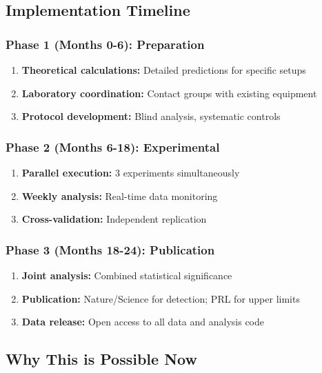 \documentclass[11pt,a4paper]{article}
\begin{document}
	\subsection{Implementation Timeline}
	
	\subsubsection{Phase 1 (Months 0-6): Preparation}
	
	\begin{enumerate}
		\item \textbf{Theoretical calculations:} Detailed predictions for specific setups
		\item \textbf{Laboratory coordination:} Contact groups with existing equipment
		\item \textbf{Protocol development:} Blind analysis, systematic controls
	\end{enumerate}
	
	\subsubsection{Phase 2 (Months 6-18): Experimental}
	
	\begin{enumerate}
		\item \textbf{Parallel execution:} 3 experiments simultaneously
		\item \textbf{Weekly analysis:} Real-time data monitoring
		\item \textbf{Cross-validation:} Independent replication
	\end{enumerate}
	
	\subsubsection{Phase 3 (Months 18-24): Publication}
	
	\begin{enumerate}
		\item \textbf{Joint analysis:} Combined statistical significance
		\item \textbf{Publication:} Nature/Science for detection; PRL for upper limits
		\item \textbf{Data release:} Open access to all data and analysis code
	\end{enumerate}
	
	\subsection{Why This is Possible Now}
	
\end{document}

